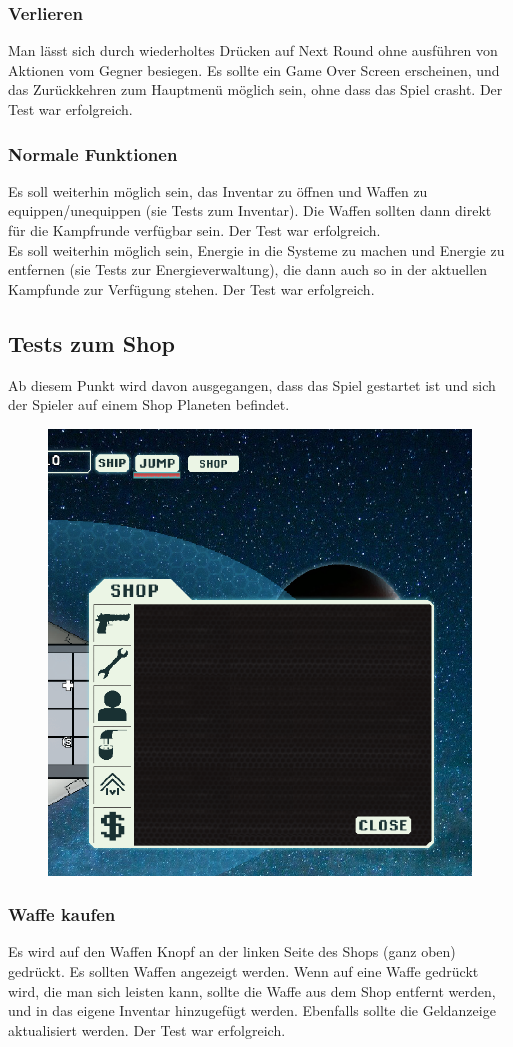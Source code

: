 \documentclass[fontsize=12pt,paper=a4,twoside]{scrartcl}
\begin{document}
\subsubsection{Verlieren}
Man lässt sich durch wiederholtes Drücken auf Next Round ohne ausführen von Aktionen vom Gegner besiegen. Es sollte ein Game Over Screen erscheinen, und das Zurückkehren zum Hauptmenü möglich sein, ohne dass das Spiel crasht.  Der Test war erfolgreich. \\
\subsubsection{Normale Funktionen} 
Es soll weiterhin möglich sein, das Inventar zu öffnen und Waffen zu equippen/unequippen (sie Tests zum Inventar). Die Waffen sollten dann direkt für die Kampfrunde verfügbar sein. Der Test war erfolgreich. \\
Es soll weiterhin möglich sein, Energie in die Systeme zu machen und Energie zu entfernen (sie Tests zur Energieverwaltung), die dann auch so in der aktuellen Kampfunde zur Verfügung stehen. Der Test war erfolgreich. \\



\subsection{Tests zum Shop}
Ab diesem Punkt wird davon ausgegangen, dass das Spiel gestartet ist und sich der Spieler auf einem Shop Planeten befindet. \\
\begin{figure}[h!]
\centering
\includegraphics[width=0.5\linewidth]{images/shop.png}
\end{figure}
\subsubsection{Waffe kaufen}
Es wird auf den Waffen Knopf an der linken Seite des Shops (ganz oben) gedrückt. Es sollten Waffen angezeigt werden. Wenn auf eine Waffe gedrückt wird, die man sich leisten kann, sollte die Waffe aus dem Shop entfernt werden, und in das eigene Inventar hinzugefügt werden. Ebenfalls sollte die Geldanzeige aktualisiert werden.  Der Test war erfolgreich. \\
\end{document}
